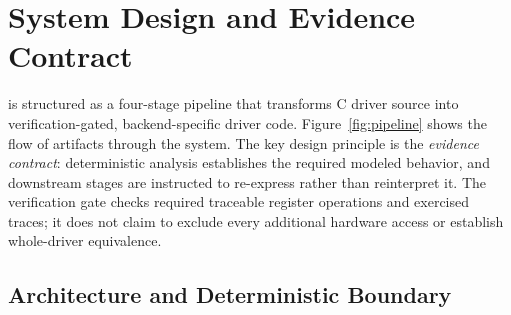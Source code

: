 
\section{System Design and Evidence Contract}
\label{sec:overview}

\reharness{} is structured as a four-stage pipeline that transforms C driver source into verification-gated, backend-specific driver code. Figure~\ref{fig:pipeline} shows the flow of artifacts through the system. The key design principle is the \emph{evidence contract}: deterministic analysis establishes the required modeled behavior, and downstream stages are instructed to re-express rather than reinterpret it. The verification gate checks required traceable register operations and exercised traces; it does not claim to exclude every additional hardware access or establish whole-driver equivalence.

\subsection{Architecture and Deterministic Boundary}

